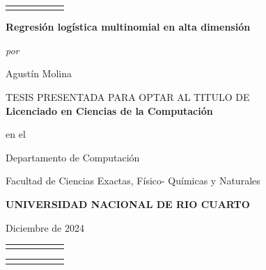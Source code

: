 \documentclass{report}
\begin{document}
	\thispagestyle{empty}
	\setcounter{page}{1}
	
	\begin{center}
		\begin{tabular}{cccccc}
			\hline 
			\hspace{10cm}
		\end{tabular}
		
		\vspace{0.5cm}
		
		\textbf{\Large{
				Regresión logística multinomial en alta dimensión} 
			\vspace{1cm} } 
		
		{\it por}\\
		
		\medskip
		
		Agustín Molina  
		
		
		
		
		\vspace{2cm}
		
		
		TESIS PRESENTADA PARA OPTAR AL TITULO DE \\
		
		{\bf Licenciado en Ciencias de la Computación}
		
		\vspace{1cm}
		
		
		en el
		
		Departamento de Computación 
		
		Facultad de Ciencias Exactas, Físico- Químicas y Naturales
		
		{\bf UNIVERSIDAD NACIONAL DE RIO CUARTO}
		
		\vspace{2cm}
		
		Diciembre de  2024
		
		\vspace{1cm}
		
		\begin{tabular}{cccccc}
			\hline 
			\hspace{10cm}
		\end{tabular}
		\begin{tabular}{cccccc}
			\hline 
			\hspace{10cm}
		\end{tabular}
		
		
		\end {center}
		
		\newpage
		
\end{document}
